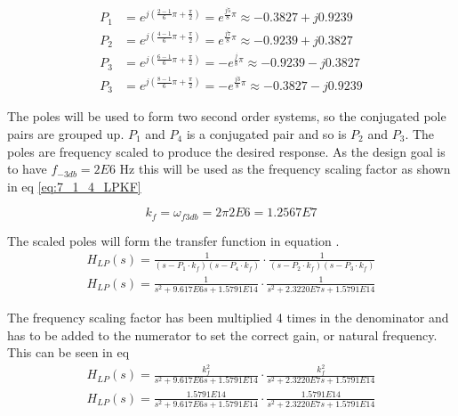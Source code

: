 \begin{equation}\label{eq:7_1_4_LPPoles1} 
    \begin{aligned}
        P_1 &= e^{j\left(\frac{2-1}{6}\pi + \frac{\pi}{2}\right)} = e^{\frac{j5}{8}\pi} \approx -0.3827 + j0.9239 \\
        P_2 &= e^{j\left(\frac{4-1}{6}\pi + \frac{\pi}{2}\right)} = e^{\frac{j7}{8}\pi} \approx -0.9239 + j0.3827 \\
        P_3 &= e^{j\left(\frac{6-1}{6}\pi + \frac{\pi}{2}\right)} = -e^{\frac{j}{8}\pi} \approx -0.9239 - j0.3827  \\
        P_3 &= e^{j\left(\frac{8-1}{6}\pi + \frac{\pi}{2}\right)} = -e^{\frac{j3}{8}\pi}\approx -0.3827 - j0.9239 
    \end{aligned}
\end{equation}

The poles will be used to form two second order systems, so the conjugated pole pairs are grouped up. $P_1$ and $P_4$ is a conjugated pair and so is $P_2$ and $P_3$. The poles are frequency scaled to produce the desired response. As the design goal is to have $f_{-3db} = 2E6$ Hz this will be used as the frequency scaling factor as shown in eq \ref{eq:7_1_4_LPKF}

\begin{equation}\label{eq:7_1_4_LPKF}
    k_f = \omega_{f3db} = 2\pi 2E6 = 1.2567E7
\end{equation}

The scaled poles will form the transfer function in equation .
\begin{equation}\label{eq:7_1_4_LPTF}
    \begin{aligned}
    H_{LP}(s) = \frac{1}{(s-P_1\cdot k_f)(s-P_4\cdot k_f)  }\cdot \frac{1}{(s-P_2\cdot k_f)(s-P_3\cdot k_f)}\\
    H_{LP}(s) = \frac{1}{s^2 + 9.617E6s + 1.5791E14}\cdot \frac{1}{s^2 + 2.3220E7s + 1.5791E14}
\end{aligned}
\end{equation}

The frequency scaling factor has been multiplied 4 times in the denominator and has to be added to the numerator to set the correct gain, or natural frequency. This can be seen in eq 
\begin{equation}\label{eq:7_1_4_LPTFKFSQ}
    \begin{aligned}
        H_{LP}(s) = \frac{k_f^2}{s^2 + 9.617E6s + 1.5791E14}\cdot \frac{k_f^2}{s^2 + 2.3220E7s + 1.5791E14}\\
    H_{LP}(s) = \frac{1.5791E14}{s^2 + 9.617E6s + 1.5791E14}\cdot \frac{1.5791E14}{s^2 + 2.3220E7s + 1.5791E14}
\end{aligned}
\end{equation}

